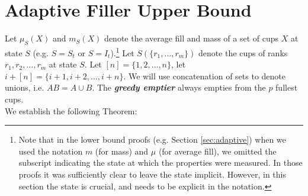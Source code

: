 \documentclass[twocolumn]{article}[10pt]
\newcommand{\defn}[1]{{\textit{\textbf{\boldmath #1}}}\xspace}
\begin{document}
\section{Adaptive Filler Upper Bound}\label{sec:adaptiveUpperBound}
Let $\mu_S(X)$ and $m_S(X)$ denote the average fill and mass of a set of cups $X$
at state $S$ (e.g. $S=S_t$ or $S=I_t$).\footnote{Note that in the lower bound
  proofs (e.g. Section \ref{sec:adaptive}) when we used the notation $m$ (for
  mass) and $\mu$ (for average fill), we omitted the subscript indicating the
  state at which the properties were measured. In those proofs it was
sufficiently clear to leave the state implicit. However, in this section the
state is crucial, and needs to be explicit in the notation.}
Let $S(\{r_1, \ldots, r_m\})$ denote the cups of ranks $r_1, r_2, \ldots, r_m$ at state $S$.
Let $[n] = \{1,2,\ldots, n\}$, let $i+[n] = \{i+1, i+2, \ldots, i+n\}$. We will
use concatenation of sets to denote unions, i.e. $AB = A\cup B$. The
\defn{greedy emptier} always empties from the $p$ fullest cups. \\
We establish the following Theorem:
\end{document}
